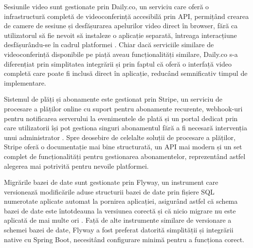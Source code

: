 Sesiunile video sunt gestionate prin Daily.co, un serviciu care oferă o infrastructură completă de videoconferință accesibilă prin API, permițând crearea de camere de sesiune și desfășurarea apelurilor video direct în browser, fără ca utilizatorul să fie nevoit să instaleze o aplicație separată, întreaga interacțiune desfășurându-se în cadrul platformei \cite{dailyco}. Chiar dacă serviciile similare de videoconferință disponibile pe piață aveau funcționalități similare, Daily.co s-a diferențiat prin simplitatea integrării și prin faptul că oferă o interfață video completă care poate fi inclusă direct în aplicație, reducând semnificativ timpul de implementare.

Sistemul de plăți și abonamente este gestionat prin Stripe, un serviciu de procesare a plăților online cu suport pentru abonamente recurente, webhook-uri pentru notificarea serverului la evenimentele de plată și un portal dedicat prin care utilizatorii își pot gestiona singuri abonamentul fără a fi necesară intervenția unui administrator \cite{stripe}. Spre deosebire de celelalte soluții de procesare a plăților, Stripe oferă o documentație mai bine structurată, un API mai modern și un set complet de funcționalități pentru gestionarea abonamentelor, reprezentând astfel alegerea mai potrivită pentru nevoile platformei.

Migrările bazei de date sunt gestionate prin Flyway, un instrument care versionează modificările aduse structurii bazei de date prin fișiere SQL numerotate aplicate automat la pornirea aplicației, asigurând astfel că schema bazei de date este întotdeauna la versiunea corectă și că nicio migrare nu este aplicată de mai multe ori \cite{flyway}. Față de alte instrumente similare de versionare a schemei bazei de date, Flyway a fost preferat datorită simplității și integrării native cu Spring Boot, necesitând configurare minimă pentru a funcționa corect.
